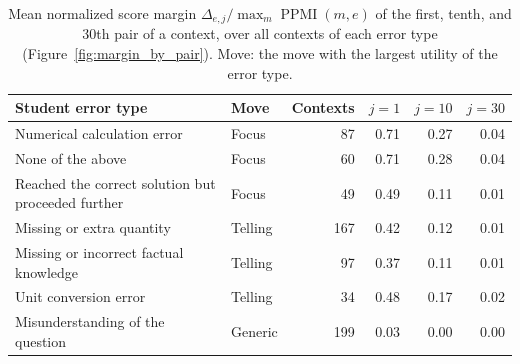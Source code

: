 \begin{table}[!t]
    \centering
    \footnotesize
    \setlength{\tabcolsep}{5pt}
    \renewcommand{\arraystretch}{1.08}
    \captionsetup{skip=4pt}
    \begin{tabularx}{\linewidth}{@{}>{\raggedright\arraybackslash}Xlrrrr@{}}
        \toprule
        Student error type & Move & Contexts & $j = 1$ & $j = 10$ & $j = 30$ \\
        \midrule
        Numerical calculation error & Focus & 87 & 0.71 & 0.27 & 0.04 \\
        None of the above & Focus & 60 & 0.71 & 0.28 & 0.04 \\
        Reached the correct solution but proceeded further & Focus & 49 & 0.49 & 0.11 & 0.01 \\
        Missing or extra quantity & Telling & 167 & 0.42 & 0.12 & 0.01 \\
        Missing or incorrect factual knowledge & Telling & 97 & 0.37 & 0.11 & 0.01 \\
        Unit conversion error & Telling & 34 & 0.48 & 0.17 & 0.02 \\
        Misunderstanding of the question & Generic & 199 & 0.03 & 0.00 & 0.00 \\
        \bottomrule
    \end{tabularx}
    \caption{Mean normalized score margin $\Delta_{e,j}/\max_{m}\operatorname{PPMI}(m,e)$ of the first, tenth, and 30th pair of a context, over all contexts of each error type (Figure~\ref{fig:margin_by_pair}). Move: the move with the largest utility of the error type.}
    \label{tab:margin_by_pair}
\end{table}
